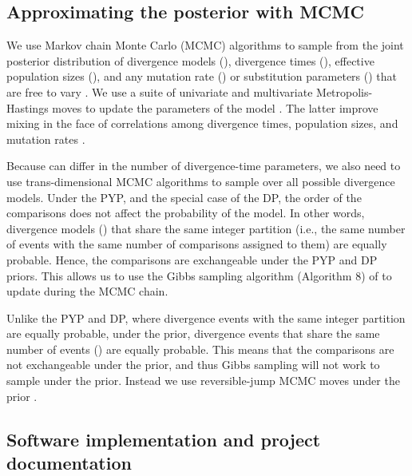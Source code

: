 \documentclass[letterpaper,12pt]{article}
\begin{document}
\subsection{Approximating the posterior with MCMC}

We use Markov chain Monte Carlo (MCMC) algorithms to sample from the joint
posterior distribution of divergence models (\etimesets), divergence times
(\etimes), effective population sizes (\epopsize), and any mutation rate
(\murate) or substitution parameters (\gfreq) that are free to vary
\citep{Oaks2018ecoevolity,Oaks2019codemog}.
We use a suite of univariate and multivariate Metropolis-Hastings moves to
update the parameters of the model \citep{Metropolis1953,Hastings1970}.
The latter improve mixing in the face of correlations among divergence times,
population sizes, and mutation rates \citep[see][]{Oaks2018ecoevolity}.

Because \etimesets can differ in the number of divergence-time parameters, we
also need to use trans-dimensional MCMC algorithms to sample over all possible
divergence models.
Under the PYP, and the special case of the DP, the order of the comparisons
does not affect the probability of the model.
In other words, divergence models (\etimesets) that share the same integer
partition (i.e., the same number of events with the same number of comparisons
assigned to them) are equally probable.
Hence, the comparisons are exchangeable under the PYP and DP priors.
This allows us to use the Gibbs sampling algorithm (Algorithm 8) of
\citet{Neal2000} to update \etimesets during the MCMC chain.

Unlike the PYP and DP, where divergence events with the same
integer partition are equally probable, under the
\wunif prior, divergence events that share the same number of events (\nevents) are
equally probable.
This means that the comparisons are not exchangeable under the \wunif prior,
and thus Gibbs sampling will not work to sample \etimesets under the \wunif
prior.
Instead we use reversible-jump MCMC moves under the \wunif prior \citep{Green1995}.



\subsection{Software implementation and project documentation}
\end{document}
